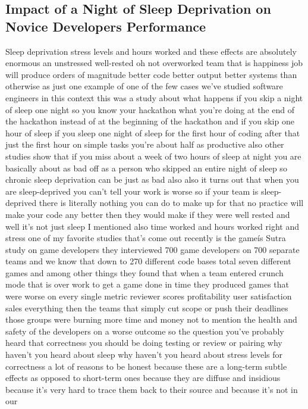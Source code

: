 \documentclass[conference, compsoc, twoside]{IEEEtran}
\begin{document}
\subsection{Impact of a Night of Sleep Deprivation on Novice Developers Performance}
Sleep deprivation stress levels and hours worked and these effects are absolutely
enormous an unstressed well-rested oh
not overworked team that is happiness
job will produce orders of magnitude
better code better output better systems
than otherwise as just one example of
one of the few cases we've studied
software engineers in this context this
was a study about what happens if you
skip a night of sleep one night so
you know your hackathon what you're
doing at the end of the hackathon
instead of at the beginning of the
hackathon and if you skip one hour of
sleep if you sleep one night of sleep
for the first hour of coding after that
just the first hour on simple tasks
you're about half as productive also
other studies show that if you miss
about a week of two hours of sleep at
night you are basically about as bad off
as a person who skipped an entire night
of sleep so chronic sleep deprivation
can be just as bad also also it turns
out that when you are sleep-deprived you
can't tell your work is worse so if your
team is sleep-deprived there is
literally nothing you can do to make up
for that no practice will make your code
any better then they would make if they
were well rested and well it's not just
sleep I mentioned also time worked and
hours worked right and stress one of my
favorite studies that's come out
recently is the gameís Sutra study on
game developers they interviewed 700
game developers on 700 separate teams
and we know that down to 270 different
code bases total seven different games
and among other things they found that
when a team entered crunch mode that is
over work to get a game done in time
they produced games that were worse on
every single metric reviewer scores
profitability user satisfaction sales
everything then the teams that simply
cut scope or push their deadlines those
groups were burning more time and money
not to mention the health and safety of
the developers on a worse outcome so the
question you've probably heard that
correctness you should be doing testing
or review or pairing why haven't you
heard about sleep why haven't you heard
about stress levels for correctness a
lot of reasons to be honest because
these are a long-term subtle effects as
opposed to short-term ones because they
are diffuse and insidious because it's
very hard to trace them back to their
source and because it's not in our
\end{document}
